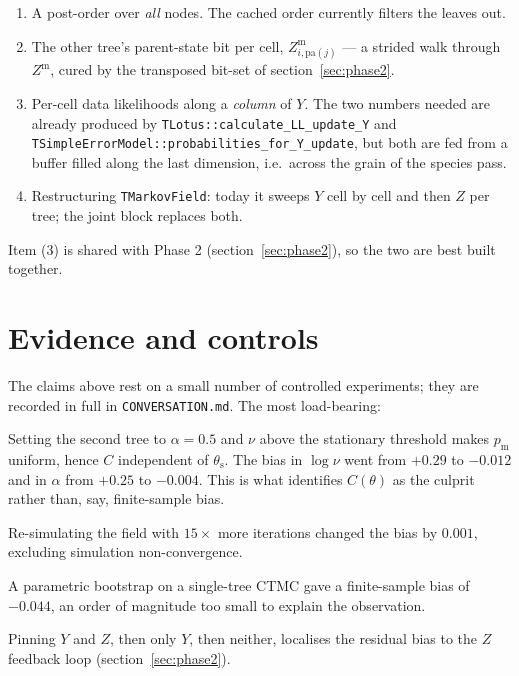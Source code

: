 \documentclass[11pt,a4paper]{article}
\newcommand{\Ys}{Y}
\newcommand{\Zm}{Z^{\mathrm{m}}}
\newcommand{\pa}{\mathrm{pa}}
\begin{document}
\begin{enumerate}[label=(\arabic*)]
  \item A post-order over \emph{all} nodes. The cached order currently filters the leaves out.
  \item The other tree's parent-state bit per cell, $\Zm_{i,\pa(j)}$ --- a strided walk
        through $\Zm$, cured by the transposed bit-set of section~\ref{sec:phase2}.
  \item Per-cell data likelihoods along a \emph{column} of $\Ys$. The two numbers needed are
        already produced by \texttt{TLotus::calculate\_LL\_update\_Y} and
        \texttt{TSimpleErrorModel::probabilities\_for\_Y\_update}, but both are fed from a
        buffer filled along the last dimension, i.e.\ across the grain of the species pass.
  \item Restructuring \texttt{TMarkovField}: today it sweeps $\Ys$ cell by cell and then $Z$
        per tree; the joint block replaces both.
\end{enumerate}

Item (3) is shared with Phase 2 (section~\ref{sec:phase2}), so the two are best built
together.

\section{Evidence and controls}
\label{sec:evidence}

The claims above rest on a small number of controlled experiments; they are recorded in
full in \texttt{CONVERSATION.md}. The most load-bearing:

\begin{description}[style=nextline]
  \item[Neutral-tree control] Setting the second tree to $\alpha = 0.5$ and $\nu$ above the
    stationary threshold makes $p_{\mathrm{m}}$ uniform, hence $C$ independent of
    $\theta_{\mathrm{s}}$. The bias in $\log\nu$ went from $+0.29$ to $-0.012$ and in
    $\alpha$ from $+0.25$ to $-0.004$. This is what identifies $C(\theta)$ as the culprit
    rather than, say, finite-sample bias.
  \item[Burn-in control] Re-simulating the field with $15\times$ more iterations changed the
    bias by $0.001$, excluding simulation non-convergence.
  \item[MLE control] A parametric bootstrap on a single-tree CTMC gave a finite-sample bias
    of $-0.044$, an order of magnitude too small to explain the observation.
  \item[Pinning ladder] Pinning $\Ys$ and $Z$, then only $\Ys$, then neither, localises the
    residual bias to the $Z$ feedback loop (section~\ref{sec:phase2}).
\end{description}
\end{document}

